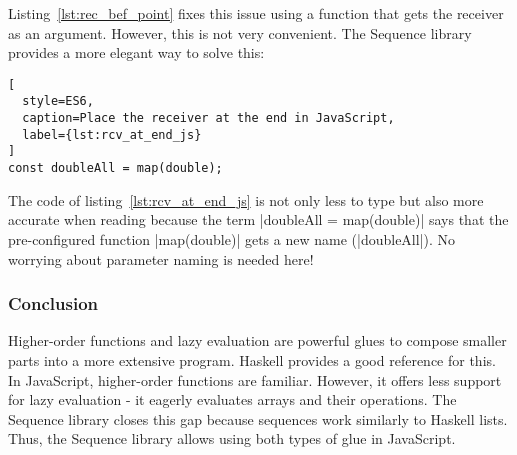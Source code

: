 Listing~\ref{lst:rec_bef_point} fixes this issue using a function that gets
the receiver as an argument. However, this is not very convenient. The Sequence
library provides a more elegant way to solve this:

\begin{lstlisting}[
  style=ES6,
  caption=Place the receiver at the end in JavaScript,
  label={lst:rcv_at_end_js}
]
const doubleAll = map(double);
\end{lstlisting}

The code of listing~\ref{lst:rcv_at_end_js} is not only less to type but also
more accurate when reading because the term |doubleAll = map(double)| says that
the pre-configured function |map(double)| gets a new name (|doubleAll|). No worrying about
parameter naming is needed here!

\subsubsection{Conclusion} %
\label{subsub:modularizing_programs_conclusion}
Higher-order functions and lazy evaluation are powerful glues to compose
smaller parts into a more extensive program. Haskell provides a good reference for
this. In JavaScript, higher-order functions are familiar. However, it
offers less support for lazy evaluation - it eagerly evaluates arrays and their
operations. The Sequence library closes this gap because sequences work
similarly to Haskell lists. Thus, the Sequence library allows using both types
of glue in JavaScript.
